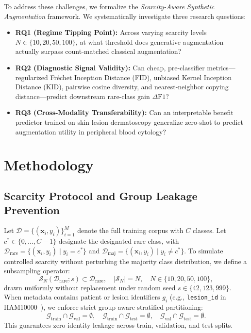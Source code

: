 \documentclass[runningheads]{llncs}
\begin{document}
To address these challenges, we formalize the \textit{Scarcity-Aware Synthetic Augmentation} framework. We systematically investigate three research questions:
\begin{itemize}
    \item \textbf{RQ1 (Regime Tipping Point):} Across varying scarcity levels $N \in \{10, 20, 50, 100\}$, at what threshold does generative augmentation actually surpass count-matched classical augmentation?
    \item \textbf{RQ2 (Diagnostic Signal Validity):} Can cheap, pre-classifier metrics---regularized Fr\'echet Inception Distance (FID), unbiased Kernel Inception Distance (KID), pairwise cosine diversity, and nearest-neighbor copying distance---predict downstream rare-class gain $\Delta\text{F1}$?
    \item \textbf{RQ3 (Cross-Modality Transferability):} Can an interpretable benefit predictor trained on skin lesion dermatoscopy generalize zero-shot to predict augmentation utility in peripheral blood cytology?
\end{itemize}

\section{Methodology}
\label{sec:method}

\subsection{Scarcity Protocol and Group Leakage Prevention}
Let $\mathcal{D} = \{(\mathbf{x}_i, y_i)\}_{i=1}^M$ denote the full training corpus with $C$ classes. Let $c^* \in \{0, \dots, C-1\}$ designate the designated rare class, with $\mathcal{D}_{\text{rare}} = \{(\mathbf{x}_i, y_i) \mid y_i = c^*\}$ and $\mathcal{D}_{\text{maj}} = \{(\mathbf{x}_i, y_i) \mid y_i \neq c^*\}$. To simulate controlled scarcity without perturbing the majority class distribution, we define a subsampling operator:
\begin{equation}
    \mathcal{S}_N(\mathcal{D}_{\text{rare}}; s) \subset \mathcal{D}_{\text{rare}}, \quad |\mathcal{S}_N| = N, \quad N \in \{10, 20, 50, 100\},
\end{equation}
drawn uniformly without replacement under random seed $s \in \{42, 123, 999\}$. When metadata contains patient or lesion identifiers $g_i$ (e.g., \texttt{lesion\_id} in HAM10000~\cite{tschandl2018ham10000}), we enforce strict group-aware stratified partitioning:
\begin{equation}
    \mathcal{G}_{\text{train}} \cap \mathcal{G}_{\text{val}} = \emptyset, \quad \mathcal{G}_{\text{train}} \cap \mathcal{G}_{\text{test}} = \emptyset, \quad \mathcal{G}_{\text{val}} \cap \mathcal{G}_{\text{test}} = \emptyset.
\end{equation}
This guarantees zero identity leakage across train, validation, and test splits.
\end{document}
